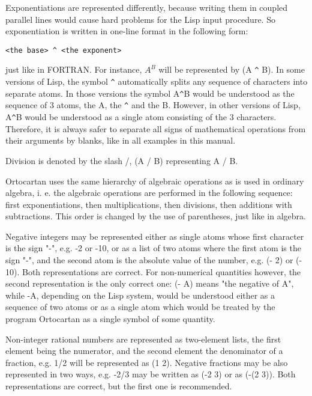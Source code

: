 Exponentiations are  represented  differently,  because writing them in coupled
parallel lines would cause hard problems for the Lisp input  procedure.  So
exponentiation  is
     written in one-line format in the following form:

\bigskip

\verb+<the base> ^ <the exponent>+

\bigskip

\noindent just like in FORTRAN.  For instance, $A^B$   will be represented
     by  (A \verb+^+ B). In some versions of Lisp, the symbol \verb+^+
automatically splits any sequence of characters into separate atoms. In those
versions the symbol A\verb+^+B would be understood as the sequence of 3 atoms,
the A, the \verb+^+ and the B. However, in other versions of Lisp, A\verb+^+B
would be understood as a single atom consisting of the 3 characters. Therefore,
it is always safer to separate all signs of mathematical operations from their
arguments by blanks, like in all examples in this manual.

Division is denoted by the slash /, (A / B)  representing A / B.

Ortocartan uses the same hierarchy of algebraic  operations  as  is  used in
ordinary algebra, i. e. the algebraic
     operations are performed in the  following  sequence:  first
     exponentiations,  then multiplications, then divisions, then
     additions with subtractions. This order is  changed  by  the
     use of parentheses, just like in algebra.

Negative integers may be represented either  as  single
     atoms whose first character is the sign "-", e.g. -2 or -10,
     or as a list of two atoms where the first atom is  the  sign
     "-",  and  the  second  atom  is  the  absolute value of the
number, e.g. (- 2) or (- 10). Both representations are  correct.  For
non-numerical quantities however,  the second representation is the only
correct one: (- A) means "the negative of A", while -A, depending on the Lisp
system, would be understood either as a sequence of two atoms or as a single
atom
     which would be treated by the program Ortocartan as a single
     symbol of some quantity.


Non-integer  rational  numbers   are   represented   as
     two-element  lists,  the  first element being the numerator,
     and the second element the denominator of a  fraction,  e.g.
     1/2  will be represented as (1 2). Negative fractions may be
     also represented in two ways, e.g. -2/3 may  be  written  as
     (-2 3) or as (-(2 3)). Both representations are correct, but
     the first one is recommended.

